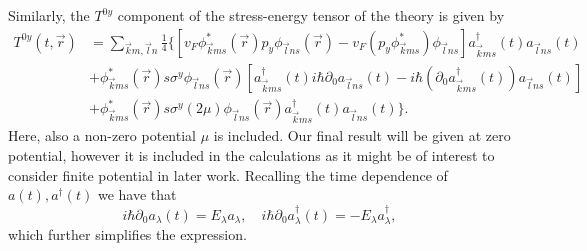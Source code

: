 Similarly, the $T^{0y}$ component of the stress-energy tensor of the theory is given by~\cite{arjonaFingerprintsConformalAnomaly2019}
\begin{equation}
  \begin{split}
    T^{0y}(t, \vec{r}) &=
    \sum\limits_{\vec{k} m, \vec{l} n}^{}
    \frac{1}{4}
    \bigg\{
    \left[
      v_F \phi ^{*}_{\vec{k} m s}(\vec{r}) p_y \phi _{\vec{l} n s}(\vec{r})
      -v_F \left( p_y \phi ^{*}_{\vec{k} m s} \right) \phi _{\vec{l} ns}
    \right] a^{\dagger}_{\vec{k} m s}(t) a_{\vec{l} n s}(t)\\
    &+ \phi ^{*}_{\vec{k} m s}(\vec{r}) s \sigma ^y \phi _{\vec{l} n s }(\vec{r})
    \left[
      a^{\dagger}_{\vec{k} m s}(t) i\hbar \partial _0  a_{\vec{l} n s}(t)
      -
      i\hbar \left(\partial _0 a^{\dagger}_{\vec{k} ms }(t) \right) a_{\vec{l} n s}(t)
    \right]\\
    &+ \phi ^{*}_{\vec{k} m s}(\vec{r}) s \sigma ^y (2\mu ) \phi _{\vec{l} n s}(\vec{r}) a^{\dagger}_{\vec{k} m s}(t) a_{\vec{l} n s}(t)
    \bigg\}.
  \end{split}
\end{equation}
Here, also a non-zero potential $\mu $ is included.
Our final result will be given at zero potential, however it is included in the calculations as it might be of interest to consider finite potential in later work.
Recalling the time dependence of $a(t), a^{\dagger}(t)$ we have that
\[
  i\hbar \partial _0 a_{\lambda }(t) = E_{\lambda }a_{\lambda },
  \quad
  i\hbar \partial _0 a^{\dagger}_{\lambda }(t) = -E_{\lambda }a^{\dagger}_{\lambda },
\]
which further simplifies the expression.

